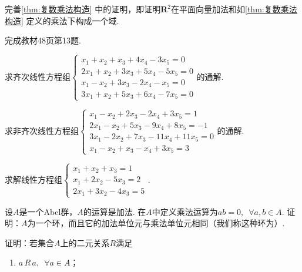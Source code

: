 \begin{exercise}

    \begin{exgroup}
        \item 完善\autoref{thm:复数乘法构造} 中的证明，即证明$\mathbf{R}^2$在平面向量加法和如\autoref*{thm:复数乘法构造} 定义的乘法下构成一个域.

        \item 完成教材48页第13题.

        \item 求齐次线性方程组$\begin{cases}
                x_1+x_2+x_3+4x_4-3x_5=0   \\
                2x_1+x_2+3x_3+5x_4-5x_5=0 \\
                x_1-x_2+3x_3-2x_4-x_5=0   \\
                3x_1+x_2+5x_3+6x_4-7x_5=0
            \end{cases}$的通解.

        \item 求非齐次线性方程组$\begin{cases}
                x_1-x_2+2x_3-2x_4+3x_5=1     \\
                2x_1-x_2+5x_3-9x_4+8x_5=-1   \\
                3x_1-2x_2+7x_3-11x_4+11x_5=0 \\
                x_1-x_2+x_3-x_4+3x_5=3
            \end{cases}$的通解.

        \item 求解线性方程组$\begin{cases}
                x_1+x_2+x_3=1   \\
                x_1+2x_2-5x_3=2 \\
                2x_1+3x_2-4x_3=5
            \end{cases}$.
    \end{exgroup}

    \begin{exgroup}
        \item 设$A$是一个Abel群，$A$的运算是加法. 在$A$中定义乘法运算为$ab=0,\enspace\forall a,b\in A$. 证明：$A$为一个环，而且它的加法单位元与乘法单位元相同（我们称这种环为）.

        \item 证明：若集合$A$上的二元关系$R$满足
        \begin{enumerate}
            \item $a\,R\,a,\enspace\forall a\in A$；


\end{enumerate}
\end{exgroup}
\end{exercise}
